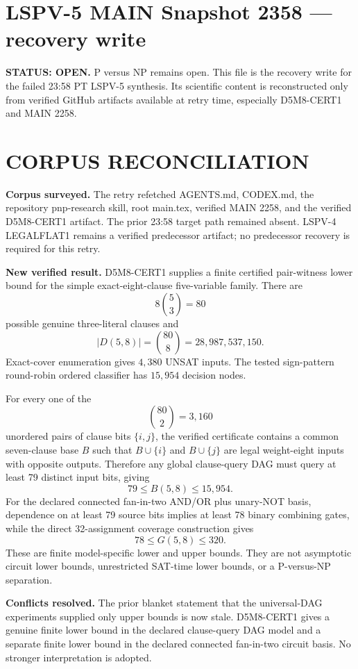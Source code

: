 \documentclass[11pt]{article}
\begin{document}
\section*{LSPV-5 MAIN Snapshot 2358 --- recovery write}
\textbf{STATUS: OPEN.} P versus NP remains open. This file is the recovery write for the failed 23:58 PT LSPV-5 synthesis. Its scientific content is reconstructed only from verified GitHub artifacts available at retry time, especially D5M8-CERT1 and MAIN 2258.

\section*{CORPUS RECONCILIATION}
\textbf{Corpus surveyed.}
The retry refetched AGENTS.md, CODEX.md, the repository pnp-research skill, root main.tex, verified MAIN 2258, and the verified D5M8-CERT1 artifact. The prior 23:58 target path remained absent. LSPV-4 LEGALFLAT1 remains a verified predecessor artifact; no predecessor recovery is required for this retry.

\textbf{New verified result.}
D5M8-CERT1 supplies a finite certified pair-witness lower bound for the simple exact-eight-clause five-variable family. There are
\[
8\binom{5}{3}=80
\]
possible genuine three-literal clauses and
\[
|D(5,8)|=\binom{80}{8}=28{,}987{,}537{,}150.
\]
Exact-cover enumeration gives \(4{,}380\) UNSAT inputs. The tested sign-pattern round-robin ordered classifier has \(15{,}954\) decision nodes.

For every one of the
\[
\binom{80}{2}=3{,}160
\]
unordered pairs of clause bits \(\{i,j\}\), the verified certificate contains a common seven-clause base \(B\) such that \(B\cup\{i\}\) and \(B\cup\{j\}\) are legal weight-eight inputs with opposite outputs. Therefore any global clause-query DAG must query at least 79 distinct input bits, giving
\[
\boxed{79\le B(5,8)\le 15{,}954}.
\]
For the declared connected fan-in-two AND/OR plus unary-NOT basis, dependence on at least 79 source bits implies at least 78 binary combining gates, while the direct 32-assignment coverage construction gives
\[
\boxed{78\le G(5,8)\le 320}.
\]
These are finite model-specific lower and upper bounds. They are not asymptotic circuit lower bounds, unrestricted SAT-time lower bounds, or a P-versus-NP separation.

\textbf{Conflicts resolved.}
The prior blanket statement that the universal-DAG experiments supplied only upper bounds is now stale. D5M8-CERT1 gives a genuine finite lower bound in the declared clause-query DAG model and a separate finite lower bound in the declared connected fan-in-two circuit basis. No stronger interpretation is adopted.
\end{document}
